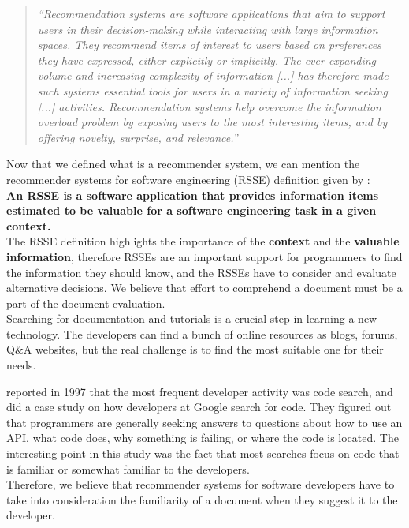 \documentclass[12pt,mscthesis]{usiinfthesis}
\begin{document}
	  \blockquote{\textit{``Recommendation systems are software applications that aim to support users in their decision-making while interacting with large information spaces. They recommend items of interest to users based on preferences they have expressed, either explicitly or implicitly. The ever-expanding volume and increasing complexity of information [...] has therefore made such systems essential tools for users in a variety of information seeking [...] activities. Recommendation systems help overcome the information overload problem by exposing users to the most interesting items, and by offering novelty, surprise, and relevance.''}}
	Now that we defined what is a recommender system, we can mention the recommender systems for software engineering (RSSE) definition given by \citet{RecommendationSystemsforSoftwareEngineering}:\\

	\textbf{An RSSE is a software application that provides information items estimated to be valuable for a software engineering task in a given context.}\\

	The RSSE definition highlights the importance of the \textbf{context} and the \textbf{valuable information}, therefore RSSEs are an important support for programmers to find the information they should know, and the RSSEs have to consider and evaluate alternative decisions. We believe that effort to comprehend a document must be a part of the document evaluation.\\


	Searching for documentation and tutorials is a crucial step in learning a new technology. The developers can find a bunch of online resources as blogs, forums, Q\&A websites, but the real challenge is to find the most suitable one for their needs.



	\citep{Singer-1997} reported in 1997 that the most frequent developer activity was code search, and \citep{Sadowski:2015} did a case study on how developers at Google search for code. They figured out that programmers are generally seeking answers to questions about how to use an API, what code does, why something is failing, or where the code is located. The interesting point in this study was the fact that most searches focus on code that is familiar or somewhat familiar to the developers.\\
	Therefore, we believe that recommender systems for software developers have to take into consideration the familiarity of a document when they suggest it to the developer. 
\end{document}
